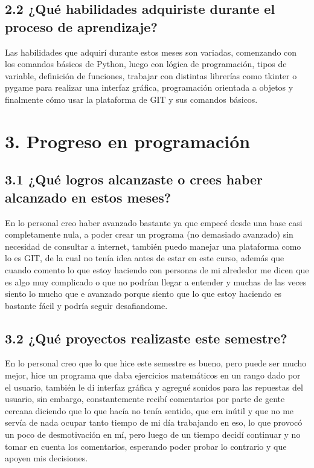 \documentclass{article}
\begin{document}
\subsection*{2.2 ¿Qué habilidades adquiriste durante el proceso de aprendizaje?}
Las habilidades que adquirí durante estos meses son variadas, comenzando con los comandos básicos de Python, luego con lógica de programación, tipos de variable, definición de funciones, trabajar con distintas librerías como tkinter o pygame para realizar una interfaz gráfica, programación orientada a objetos y finalmente cómo usar la plataforma de GIT y sus comandos básicos.

\section*{3. Progreso en programación}

\subsection*{3.1 ¿Qué logros alcanzaste o crees haber alcanzado en estos meses?}
En lo personal creo haber avanzado bastante ya que empecé desde una base casi completamente nula, a poder crear un programa (no demasiado avanzado) sin necesidad de consultar a internet, también puedo manejar una plataforma como lo es GIT, de la cual no tenía idea antes de estar en este curso, además que cuando comento lo que estoy haciendo con personas de mi alrededor me dicen que es algo muy complicado o que no podrían llegar a entender y muchas de las veces siento lo mucho que e avanzado porque siento que lo que estoy haciendo es bastante fácil y podría seguir desafiandome.

\subsection*{3.2 ¿Qué proyectos realizaste este semestre?}
En lo personal creo que lo que hice este semestre es bueno, pero puede ser mucho mejor, hice un programa que daba ejercicios matemáticos en un rango dado por el usuario, también le di interfaz gráfica y agregué sonidos para las repuestas del usuario, sin embargo,  constantemente recibí comentarios por parte de gente cercana diciendo que lo que hacía no tenía sentido, que era inútil y que no me servía de nada ocupar tanto tiempo de mi día trabajando en eso, lo que provocó un poco de desmotivación en mí, pero luego de un tiempo decidí continuar y no tomar en cuenta los comentarios, esperando poder probar lo contrario y que apoyen mis decisiones.
\end{document}
